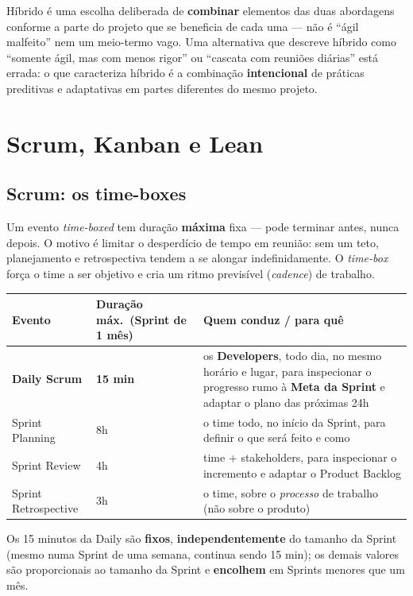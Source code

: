 \begin{cuidado}
Híbrido é uma escolha deliberada de \textbf{combinar} elementos das duas
abordagens conforme a parte do projeto que se beneficia de cada uma --- não
é “ágil malfeito” nem um meio-termo vago. Uma alternativa que descreve
híbrido como “somente ágil, mas com menos rigor” ou “cascata com reuniões
diárias” está errada: o que caracteriza híbrido é a combinação
\textbf{intencional} de práticas preditivas e adaptativas em partes
diferentes do mesmo projeto.
\end{cuidado}

\section{Scrum, Kanban e Lean}

\subsection{Scrum: os time-boxes}

\begin{conceito}
Um evento \textit{time-boxed} tem duração \textbf{máxima} fixa --- pode
terminar antes, nunca depois. O motivo é limitar o desperdício de tempo em
reunião: sem um teto, planejamento e retrospectiva tendem a se alongar
indefinidamente. O \textit{time-box} força o time a ser objetivo e cria um
ritmo previsível (\textit{cadence}) de trabalho.

\begin{center}
\begin{tabular}{@{}p{3.6cm}p{2.2cm}p{6.4cm}@{}}
\toprule
\textbf{Evento} & \textbf{Duração máx.\ (Sprint de 1 mês)} & \textbf{Quem conduz / para quê} \\
\midrule
\textbf{Daily Scrum} & \textbf{15 min} & os \textbf{Developers}, todo dia, no
mesmo horário e lugar, para inspecionar o progresso rumo à \textbf{Meta da
Sprint} e adaptar o plano das próximas 24h \\
Sprint Planning & 8h & o time todo, no início da Sprint, para definir o que
será feito e como \\
Sprint Review & 4h & time + stakeholders, para inspecionar o incremento e
adaptar o Product Backlog \\
Sprint Retrospective & 3h & o time, sobre o \emph{processo} de trabalho
(não sobre o produto) \\
\bottomrule
\end{tabular}
\end{center}

Os 15 minutos da Daily são \textbf{fixos}, \textbf{independentemente} do
tamanho da Sprint (mesmo numa Sprint de uma semana, continua sendo 15 min);
os demais valores são proporcionais ao tamanho da Sprint e \textbf{encolhem}
em Sprints menores que um mês.
\end{conceito}

